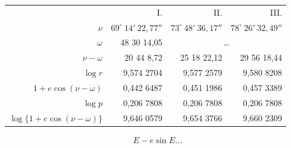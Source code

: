 \documentclass[12pt,a4paper]{article}
\theoremstyle{plain}
\theoremstyle{definition}
\theoremstyle{remark}
\begin{document}
\begin{center}
\begin{tabular}{r@{\quad}r@{\quad}r@{\quad}r}
& I. & II. & III. \\
$\nu$ & $69^\circ\ 14'\ 22{,}77''$ & $73^\circ\ 48'\ 36{,}17''$ & $78^\circ\ 26'\ 32{,}49''$ \\
$\omega$ & 48 30 14,05 & \multicolumn{2}{c}{\dots} \\
$\nu - \omega$ & 20 44 8,72 & 25 18 22,12 & 29 56 18,44 \\
$\log r$ & 9,574 2704 & 9,577 2579 & 9,580 8208 \\
$1 + e \cos(\nu - \omega)$ & 0,442 6487 & 0,451 1986 & 0,457 3389 \\
$\log p$ & 0,206 7808 & 0,206 7808 & 0,206 7808 \\
$\log \{1 + e \cos(\nu - \omega)\}$ & 9,646 0579 & 9,654 3766 & 9,660 2309
\end{tabular}
\end{center}

\begin{align*}
E - e \sin E \dots
\end{align*}
\end{document}
